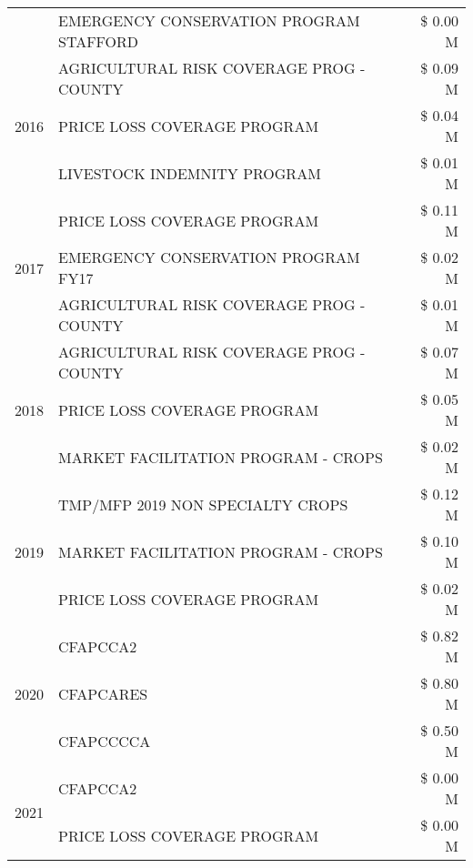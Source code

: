 \begin{tabular}{llr}
 & EMERGENCY CONSERVATION PROGRAM STAFFORD & \$ 0.00 M \\
\cline{1-3}
\multirow[t]{3}{*}{2016} & AGRICULTURAL RISK COVERAGE PROG - COUNTY & \$ 0.09 M \\
 & PRICE LOSS COVERAGE PROGRAM & \$ 0.04 M \\
 & LIVESTOCK INDEMNITY PROGRAM & \$ 0.01 M \\
\cline{1-3}
\multirow[t]{3}{*}{2017} & PRICE LOSS COVERAGE PROGRAM & \$ 0.11 M \\
 & EMERGENCY CONSERVATION PROGRAM FY17 & \$ 0.02 M \\
 & AGRICULTURAL RISK COVERAGE PROG - COUNTY & \$ 0.01 M \\
\cline{1-3}
\multirow[t]{3}{*}{2018} & AGRICULTURAL RISK COVERAGE PROG - COUNTY & \$ 0.07 M \\
 & PRICE LOSS COVERAGE PROGRAM & \$ 0.05 M \\
 & MARKET FACILITATION PROGRAM - CROPS & \$ 0.02 M \\
\cline{1-3}
\multirow[t]{3}{*}{2019} & TMP/MFP 2019 NON SPECIALTY CROPS & \$ 0.12 M \\
 & MARKET FACILITATION PROGRAM - CROPS & \$ 0.10 M \\
 & PRICE LOSS COVERAGE PROGRAM & \$ 0.02 M \\
\cline{1-3}
\multirow[t]{3}{*}{2020} & CFAPCCA2 & \$ 0.82 M \\
 & CFAPCARES & \$ 0.80 M \\
 & CFAPCCCCA & \$ 0.50 M \\
\cline{1-3}
\multirow[t]{2}{*}{2021} & CFAPCCA2 & \$ 0.00 M \\
 & PRICE LOSS COVERAGE PROGRAM & \$ 0.00 M \\
\cline{1-3}
\bottomrule
\end{tabular}
